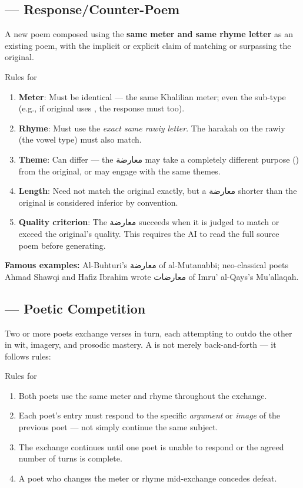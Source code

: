 \subsection{ — Response/Counter-Poem}
\label{subsec:muarada}

A new poem composed using the \textbf{same meter and same rhyme letter} as an existing poem, with the implicit or explicit claim of matching or surpassing the original.

\begin{rulebox}{Rules for }
\begin{enumerate}
  \item \textbf{Meter}: Must be identical — the same Khalilian meter; even the sub-type (e.g., if original uses , the response must too).
  \item \textbf{Rhyme}: Must use the \textit{exact same rawiy letter}. The harakah on the rawiy (the vowel type) must also match.
  \item \textbf{Theme}: Can differ — the معارضة may take a completely different purpose () from the original, or may engage with the same themes.
  \item \textbf{Length}: Need not match the original exactly, but a معارضة shorter than the original is considered inferior by convention.
  \item \textbf{Quality criterion}: The معارضة succeeds when it is judged to match or exceed the original's quality. This requires the AI to read the full source poem before generating.
\end{enumerate}
\end{rulebox}

\textbf{Famous examples:} Al-Buhturi's معارضة of al-Mutanabbi; neo-classical poets Ahmad Shawqi and Hafiz Ibrahim wrote معارضات of Imru' al-Qays's Mu'allaqah.

\subsection{ — Poetic Competition}
\label{subsec:musajala}

Two or more poets exchange verses in turn, each attempting to outdo the other in wit, imagery, and prosodic mastery. A  is not merely back-and-forth — it follows rules:

\begin{rulebox}{Rules for }
\begin{enumerate}
  \item Both poets use the same meter and rhyme throughout the exchange.
  \item Each poet's entry must respond to the specific \textit{argument} or \textit{image} of the previous poet — not simply continue the same subject.
  \item The exchange continues until one poet is unable to respond or the agreed number of turns is complete.
  \item A poet who changes the meter or rhyme mid-exchange concedes defeat.
\end{enumerate}
\end{rulebox}

